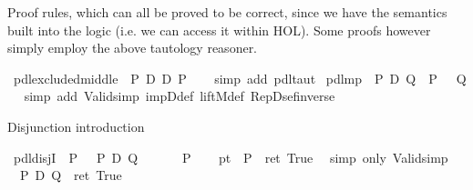 \begin{isabellebody}
%
\isamarkuptrue%
%
\begin{isamarkuptext}%
Proof rules, which can all be proved to be correct, since we have
  the semantics built into the logic (i.e. we can access it within HOL).
  Some proofs however simply employ the above tautology reasoner.
  \label{isa:proof-rules}%
\end{isamarkuptext}%
\isamarkuptrue%
\ pdl{\isacharunderscore}excluded{\isacharunderscore}middle{\isacharcolon}\ {\isachardoublequote}{\isasymturnstile}\ P\ {\isasymor}\isactrlsub D\ {\isacharparenleft}{\isasymnot}\isactrlsub D\ P{\isacharparenright}{\isachardoublequote}\isanewline
\ \ \isamarkupfalse%
\ {\isacharparenleft}simp\ add{\isacharcolon}\ pdl{\isacharunderscore}taut{\isacharparenright}\isanewline
\isanewline
\isanewline
\isamarkupfalse%
\ pdl{\isacharunderscore}mp{\isacharcolon}\ {\isachardoublequote}{\isasymlbrakk}{\isasymturnstile}\ P\ {\isasymlongrightarrow}\isactrlsub D\ Q{\isacharsemicolon}\ {\isasymturnstile}\ P{\isasymrbrakk}\ {\isasymLongrightarrow}\ {\isasymturnstile}\ Q{\isachardoublequote}\isanewline
\ \ \isamarkupfalse%
simp\ add{\isacharcolon}\ Valid{\isacharunderscore}simp\ impD{\isacharunderscore}def\ liftM{}{\isacharunderscore}def\ Rep{\isacharunderscore}Dsef{\isacharunderscore}inverse{\isacharparenright}\isamarkupfalse%
%
\begin{isamarkuptext}%
Disjunction introduction%
\end{isamarkuptext}%
\isamarkuptrue%
\ pdl{\isacharunderscore}disjI{}{\isacharcolon}\ {\isachardoublequote}{\isasymturnstile}\ P\ {\isasymLongrightarrow}\ {\isasymturnstile}\ {\isacharparenleft}P\ {\isasymor}\isactrlsub D\ Q{\isacharparenright}{\isachardoublequote}\isanewline
\isamarkupfalse%
\ {\isacharminus}\isanewline
\ \ \isamarkupfalse%
\ {\isachardoublequote}{\isasymturnstile}\ P{\isachardoublequote}\isanewline
\ \ \isamarkupfalse%
\ pt{\isacharcolon}\ {\isachardoublequote}{\isasymDown}\ P\ {\isacharequal}\ ret\ True{\isachardoublequote}\ \isamarkupfalse%
\ {\isacharparenleft}simp\ only{\isacharcolon}\ Valid{\isacharunderscore}simp{\isacharparenright}\isanewline
\ \ \isamarkupfalse%
\ {\isachardoublequote}{\isasymDown}\ {\isacharparenleft}P\ {\isasymor}\isactrlsub D\ Q{\isacharparenright}\ {\isacharequal}\ ret\ True{\isachardoublequote}\ \isanewline
\ \ \isamarkupfalse%
\ {\isacharminus}\isanewline

\end{isabellebody}
